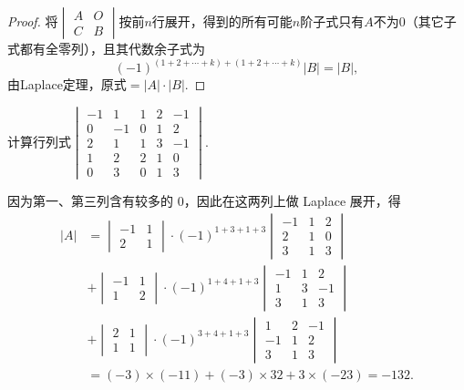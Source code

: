 \begin{proof}
    将$\begin{vmatrix}
        A & O \\
        C & B
    \end{vmatrix}$按前$n$行展开，得到的所有可能$n$阶子式只有$A$不为0（其它子式都有全零列），且其代数余子式为
    \[(-1)^{(1+2+\cdots+k)+(1+2+\cdots+k)}|B|=|B|,\]
    由Laplace定理，原式$=|A|\cdot|B|$.
\end{proof}

\begin{example}{}{}
    计算行列式$\begin{vmatrix}
            -1 & 1  & 1 & 2 & -1 \\
            0  & -1 & 0 & 1 & 2  \\
            2  & 1  & 1 & 3 & -1 \\
            1  & 2  & 2 & 1 & 0  \\
            0  & 3  & 0 & 1 & 3
        \end{vmatrix}$.
\end{example}

\begin{solution}
    因为第一、第三列含有较多的 $0$，因此在这两列上做 Laplace 展开，得
    \begin{align*}
        |A| & = \begin{vmatrix}
                    -1 & 1 \\ 2 & 1
                \end{vmatrix} \cdot (-1)^{1+3+1+3}
        \begin{vmatrix}
            -1 & 1 & 2 \\ 2 & 1 & 0 \\ 3 & 1 & 3
        \end{vmatrix}                                 \\
            & + \begin{vmatrix}
                    -1 & 1 \\ 1 & 2
                \end{vmatrix} \cdot (-1)^{1+4+1+3}
        \begin{vmatrix}
            -1 & 1 & 2 \\ 1 & 3 & -1 \\ 3 & 1 & 3
        \end{vmatrix}                                \\
            & + \begin{vmatrix}
                    2 & 1 \\ 1 & 1
                \end{vmatrix} \cdot (-1)^{3+4+1+3}
        \begin{vmatrix}
            1 & 2 & -1 \\ -1 & 1 & 2 \\ 3 & 1 & 3
        \end{vmatrix}                                \\
            & = (-3) \times (-11) + (-3) \times 32 + 3 \times (-23) = -132.
    \end{align*}
\end{solution}


